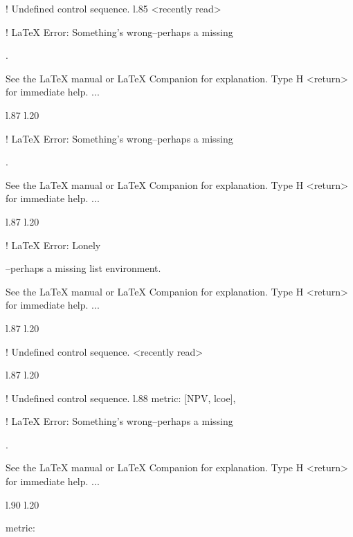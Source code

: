 {{{{{! Undefined control sequence.
l.85 <recently read> \xmlNode
                             

! LaTeX Error: Something's wrong--perhaps a missing \item.

See the LaTeX manual or LaTeX Companion for explanation.
Type  H <return>  for immediate help.
 ...                                              
                                                  
l.87 l.20     \item \xmlNode
                            

! LaTeX Error: Something's wrong--perhaps a missing \item.

See the LaTeX manual or LaTeX Companion for explanation.
Type  H <return>  for immediate help.
 ...                                              
                                                  
l.87 l.20     \item \xmlNode
                            

! LaTeX Error: Lonely \item--perhaps a missing list environment.

See the LaTeX manual or LaTeX Companion for explanation.
Type  H <return>  for immediate help.
 ...                                              
                                                  
l.87 l.20     \item \xmlNode
                            
! Undefined control sequence.
<recently read> \xmlNode 
                         
l.87 l.20     \item \xmlNode
                            
! Undefined control sequence.
l.88                        {metric}: \xmlDesc
                                              {[NPV, lcoe]},

! LaTeX Error: Something's wrong--perhaps a missing \item.

See the LaTeX manual or LaTeX Companion for explanation.
Type  H <return>  for immediate help.
 ...                                              
                                                  
l.90 l.20     \item \xmlNode
                            {metric}: \xmlDesc

}}}}}
